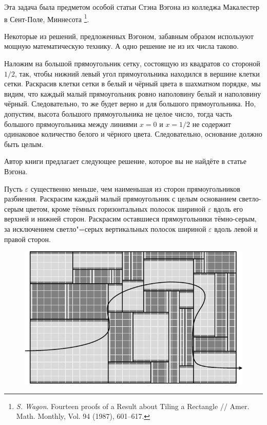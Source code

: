 \documentclass[twoside]{book}
\begin{document}
Эта задача была предметом особой 
статьи Стэна Вэгона из колледжа Макалестер в Сент-Поле, Миннесота%
\footnote{\emph{S. Wagon}. Fourteen proofs of a Result about Tiling a Rectangle /\!/ {Amer. Math. Monthly}, Vol. 94 (1987), 601--617.}.

Некоторые из решений, предложенных Вэгоном, забавным образом используют мощную математическую технику.
А одно решение не из их числа таково.


Наложим на большой прямоугольник сетку, состоящую из квадратов со стороной $1/2$, так, чтобы нижний левый угол прямоугольника находился в вершине клетки сетки.
Раскрасив клетки сетки в белый и чёрный цвета в шахматном порядке, 
мы видим, что каждый малый прямоугольник ровно наполовину белый и наполовину чёрный.
Следовательно, то же будет верно и для большого прямоугольника.
Но, допустим, высота большого прямоугольника не целое число, тогда часть 
большого прямоугольника между линиями $x=0$ и $x=1/2$ не содержит одинаковое количество белого и чёрного цвета.
Следовательно, основание должно быть целым.\heart

Автор книги предлагает следующее решение, которое вы не найдёте в статье Вэгона.

Пусть $\varepsilon$ существенно меньше, чем наименьшая из сторон прямоугольников разбиения.
Раскрасим каждый малый прямоугольник с целым основанием светло-серым цветом, кроме тёмных горизонтальных полосок шириной $\varepsilon$ вдоль его верхней и нижней сторон.
Раскрасим оставшиеся прямоугольники тёмно-серым, за исключением светло"=серых вертикальных полосок шириной $\varepsilon$ вдоль левой и правой сторон.

\begin{figure}[!ht]
\centering
\includegraphics[scale=.95]{mp/wink-2}
\end{figure}
\end{document}
